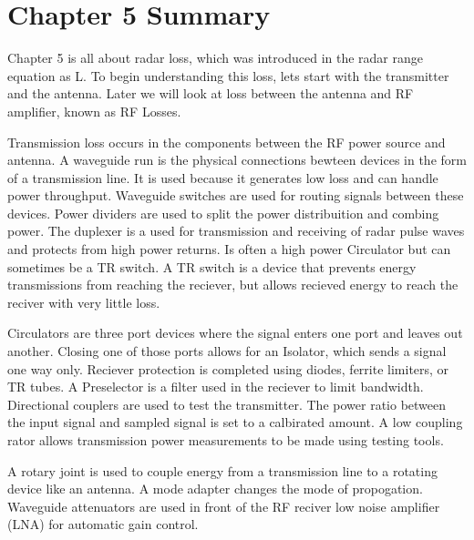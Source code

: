 \documentclass[12pt]{article}
\begin{document}
\section{Chapter 5 Summary}
Chapter 5 is all about radar loss, which was introduced in the radar range equation as L. To begin understanding this loss, lets start with the transmitter and the antenna. Later we will look at loss between the antenna and RF amplifier, known as RF Losses. 

Transmission loss occurs in the components between the RF power source and antenna. A waveguide run is the physical connections bewteen devices in the form of a transmission line. It is used because it generates low loss and can handle power throughput. Waveguide switches are used for routing signals between these devices. Power dividers are used to split the power distribuition and combing power. The duplexer is a used for transmission and receiving of radar pulse waves and protects from high power returns. Is often a high power Circulator but can sometimes be a TR switch. A TR switch is a device that prevents energy transmissions from reaching the reciever, but allows recieved energy to reach the reciver with very little loss. 

Circulators are three port devices where the signal enters one port and leaves out another. Closing one of those ports allows for an Isolator, which sends a signal one way only. Reciever protection is completed using diodes, ferrite limiters, or TR tubes. A Preselector is a filter used in the reciever to limit bandwidth. Directional couplers are used to test the transmitter. The power ratio between the input signal and sampled signal is set to a calbirated amount. A low coupling rator allows transmission power measurements to be made using testing tools. 

A rotary joint is used to couple energy from a transmission line to a rotating device like an antenna. A mode adapter changes the mode of propogation. Waveguide attenuators are used in front of the RF reciver low noise amplifier (LNA) for automatic gain control. 
\end{document}
